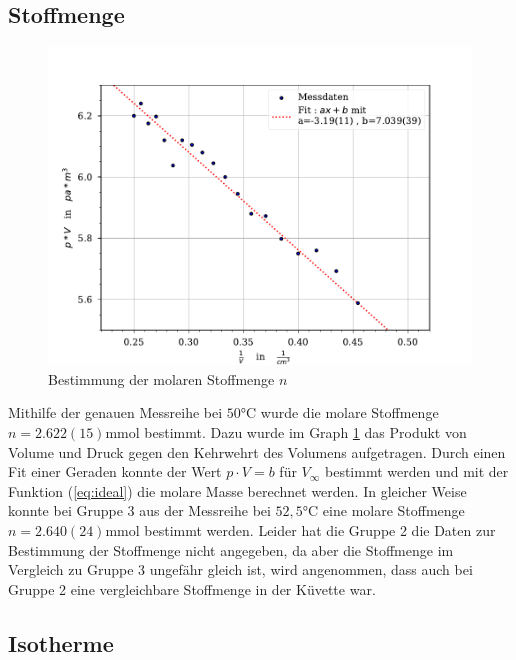 \documentclass[11pt, a4paper]{article}
\begin{document}
    \subsection{Stoffmenge}
    \begin{figure}
        \centering
        \includegraphics[width=\textwidth]{./Plots/3Plot_n.pdf}

        \caption{Bestimmung der molaren Stoffmenge $n$}
        \label{fig:n}
    \end{figure}
    
    Mithilfe der genauen Messreihe bei $50 \si{\celsius}$ wurde die molare Stoffmenge $n = 2.622(15) \si{\milli\mole}$ bestimmt.
    Dazu wurde im Graph \ref{fig:n} das Produkt von Volume und Druck gegen den Kehrwehrt des Volumens aufgetragen. Durch einen Fit einer
    Geraden konnte der Wert $p \cdot V = b$ für $V_{\infty}$ bestimmt werden und mit der Funktion (\ref{eq:ideal}) die molare Masse berechnet werden.
    In gleicher Weise konnte bei Gruppe 3 aus der Messreihe bei $52,5 \si{\celsius}$  eine molare Stoffmenge
    $n = 2.640(24) \si{\milli\mole}$ bestimmt werden. Leider hat die Gruppe 2 die Daten zur Bestimmung der Stoffmenge nicht angegeben, da aber
    die Stoffmenge im Vergleich zu Gruppe 3 ungefähr gleich ist, wird angenommen, dass auch bei Gruppe 2 eine vergleichbare Stoffmenge
    in der Küvette war.

    \subsection{Isotherme}
    
\end{document}
